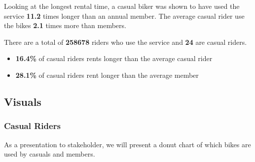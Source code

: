 \documentclass[
]{article}
\providecommand{\tightlist}{%
  \setlength{\itemsep}{0pt}\setlength{\parskip}{0pt}}
\begin{document}
Looking at the longest rental time, a casual biker was shown to have
used the service \textbf{11.2} times longer than an annual member. The
average casual rider use the bikes \textbf{2.1} times more than members.

There are a total of \textbf{258678} riders who use the service and
\textbf{24} are casual riders.

\begin{itemize}
\tightlist
\item
  \textbf{16.4\%} of casual riders rents longer than the average casual
  rider
\item
  \textbf{28.1\%} of casual riders rent longer than the average member
\end{itemize}

\hypertarget{visuals}{%
\subsection{Visuals}\label{visuals}}

\hypertarget{casual-riders}{%
\subsubsection{Casual Riders}\label{casual-riders}}

As a presentation to stakeholder, we will present a donut chart of which
bikes are used by casuals and members.
\end{document}
